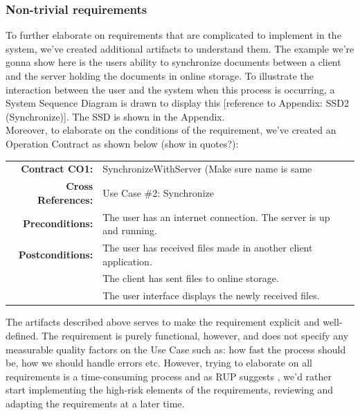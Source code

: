 \subsubsection{Non-trivial requirements}
To further elaborate on requirements that are complicated to implement in the system, we’ve created additional artifacts to understand them. The example we’re gonna show here is the users ability to synchronize documents between a client and the server holding the documents in online storage. To illustrate the interaction between the user and the system when this process is occurring, a System Sequence Diagram is drawn to display this [reference to Appendix: SSD2 (Synchronize)]. The SSD is shown in the Appendix.\\
Moreover, to elaborate on the conditions of the requirement, we’ve created an Operation Contract as shown below (show in quotes?):\\
\begin{table}[ht]\centering
  \begin{tabularx}{\textwidth}{@{}rXXl@{}}\toprule
    \textbf{Contract CO1:} & SynchronizeWithServer (Make sure name is same\\
    \textbf{Cross References:} & Use Case \#2: Synchronize\\
    \textbf{Preconditions:} &  The user has an internet connection. The server is up and running.\\
    \textbf{Postconditions:} & The user has received files made in another client application.\\
    & The client has sent files to online storage.\\
    & The user interface displays the newly received files.\\
    \bottomrule
  \end{tabularx}
\end{table}
The artifacts described above serves to make the requirement explicit and well-defined. The requirement is purely functional, however, and does not specify any measurable quality factors on the Use Case such as: how fast the process should be, how we should handle errors etc. However, trying to elaborate on all requirements is a time-consuming process and as RUP suggests \cite[12.2 p.~196]{OOAD}, we’d rather start implementing the high-risk elements of the requirements, reviewing and adapting the requirements at a later time. \\
